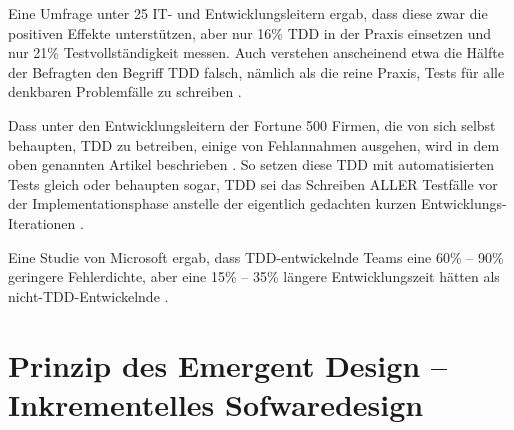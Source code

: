 Eine Umfrage unter 25 IT- und Entwicklungsleitern ergab, dass diese zwar die positiven Effekte unterstützen, aber nur 16\% TDD in der Praxis einsetzen und nur 21\% Testvollständigkeit messen. Auch verstehen anscheinend etwa die Hälfte der Befragten den Begriff TDD falsch, nämlich als die reine Praxis, Tests für alle denkbaren Problemfälle zu schreiben \citep{stelligent_inc_stelligent_2007}.

Dass unter den Entwicklungsleitern der Fortune 500 Firmen, die von sich selbst behaupten, TDD zu betreiben, einige von Fehlannahmen ausgehen, wird in dem oben genannten Artikel beschrieben \citep{janzen_does_2008}. So setzen diese TDD mit automatisierten Tests gleich oder behaupten sogar, TDD sei das Schreiben ALLER Testfälle vor der Implementationsphase anstelle der eigentlich gedachten kurzen Entwicklungs-Iterationen \citep{janzen_does_2008}.


Eine Studie von Microsoft ergab, dass TDD-entwickelnde Teams eine 60\% -- 90\% geringere Fehlerdichte, aber eine 15\% -- 35\% längere Entwicklungszeit hätten als nicht-TDD-Entwickelnde \citep{nagappan_realizing_2008}.



\section{Prinzip des Emergent Design -- Inkrementelles Sofwaredesign}
\label{sec:tddEmergent}





